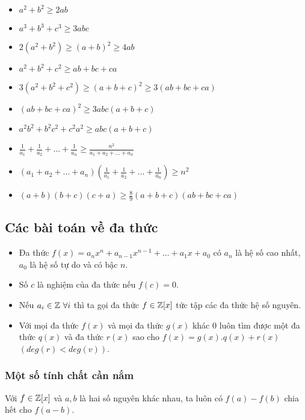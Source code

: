 \begin{itemize}
	\item $a^2 + b^2 \ge 2ab$

	\item $a^3 + b^3 + c^3 \ge 3abc$

	\item $2(a^2 + b^2) \ge (a + b)^2 \ge 4ab$

	\item $a^2 + b^2 + c^2 \ge ab + bc + ca$

	\item $3(a^2 + b^2 + c^2) \ge (a + b + c)^2 \ge 3(ab + bc + ca)$

	\item $(ab + bc + ca)^2 \ge 3abc(a + b + c)$

	\item $a^2b^2 + b^2c^2 + c^2a^2 \ge abc(a + b + c)$

	\item $\displaystyle \frac{1}{a_1} + \frac{1}{a_2} + ... + \frac{1}{a_n} \ge \frac{n^2}{a_1 + a_2 + ... + a_n}$

	\item $\displaystyle (a_1 + a_2 + ... + a_n)\left(\frac{1}{a_1} + \frac{1}{a_2} + ... + \frac{1}{a_n} \right) \ge n^2$

	\item $\displaystyle (a + b)(b + c)(c + a) \ge \frac{8}{9}(a + b + c)(ab + bc + ca)$
\end{itemize}

\subsection{Các bài toán về đa thức}
\begin{itemize}
	\item
	Đa thức $f(x) = a_nx^n + a_{n - 1}x^{n - 1} + \ldots + a_1x + a_0$ có $a_n$ là hệ số cao nhất, $a_0$ là hệ số tự do và có bậc $n$.
	\item
	Số $c$ là nghiệm của đa thức nếu $f(c) = 0$.
	\item
	Nếu $a_i \in \mathbb{Z} \ \forall i$ thì ta gọi đa thức $f \in \mathbb{Z}[x]$ tức tập các đa thức hệ số nguyên.
	\item
	Với mọi đa thức $f(x)$ và mọi đa thức $g(x)$ khác $0$ luôn tìm được một đa thức $q(x)$ và đa thức $r(x)$ sao cho $f(x) = g(x).q(x) + r(x)$ $(deg(r) < deg(v))$.
\end{itemize}

\subsubsection{Một số tính chất cần nắm}
Với $f \in \mathbb{Z}[x]$ và $a, b$ là hai số nguyên khác nhau, ta luôn có $f(a) - f(b)$ chia hết cho $f(a - b)$.

